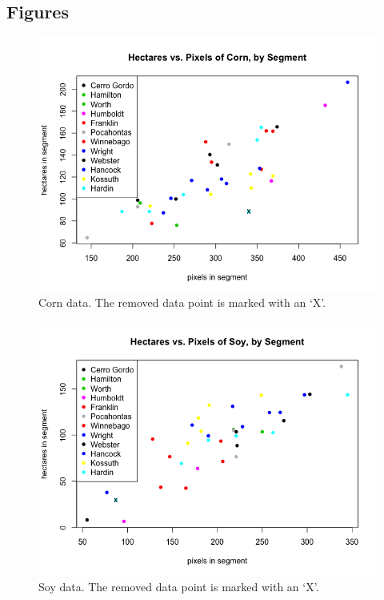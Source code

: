 \documentclass{article}
\begin{document}
\subsection{Figures}

\begin{figure}[H]
	\centering
	\includegraphics[scale=0.45]{cornplot}
	\caption{Corn data. The removed data point is marked with an `X'.}
	\label{cornplot}
\end{figure}

\begin{figure}[H]
	\centering
	\includegraphics[scale=0.45]{soyplot}
	\caption{Soy data. The removed data point is marked with an `X'.}
	\label{soyplot}
\end{figure}
\end{document}
